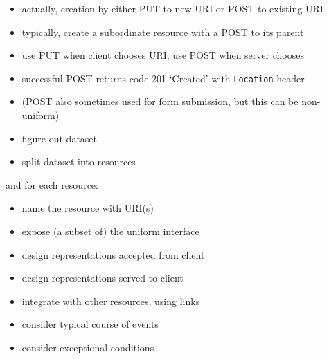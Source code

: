 \documentclass{sepslide-soa-faked} %
\begin{document}
\begin{slide}
\begin{itemize}
\item actually, creation by either PUT to new URI or POST to existing URI
\item typically, create a subordinate resource with a POST to its parent
\item use PUT when client chooses URI; use POST when server chooses 
\item successful POST returns code 201 `Created' with \texttt{Location} header
\item (POST also sometimes used for form submission, but this can be non-uniform)
\end{itemize}
\end{slide}

\begin{slide}
\begin{itemize}
\item figure out dataset
\item split dataset into resources
\end{itemize}
and for each resource:
\begin{itemize}
\item name the resource with URI(s)
\item expose (a subset of) the uniform interface
\item design representations accepted from client
\item design representations served to client
\item integrate with other resources, using links
\item consider typical course of events
\item consider exceptional conditions
\end{itemize}
\end{slide}
\end{document}
